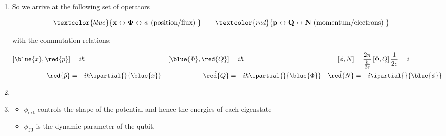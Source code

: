 \begin{enumerate}
  \item So we arrive at the following set of operators
  
  \begin{equation}
  { \textcolor{blue}{\mathbf{x\leftrightarrow \Phi \leftrightarrow \phi} \text{ (position/flux) }}\qquad \textcolor{red}{\mathbf{p\leftrightarrow Q \leftrightarrow N \text{ (momentum/electrons) }}}}
  \end{equation}
  
  \noindent with the commutation relations:
  
  \begin{align}
  \left[\blue{x},\red{p}\right] & =i\hbar & \left[\blue{\Phi},\red{Q}\right] & = i\hbar & \left[\phi,N\right] & = \frac{2\pi}{\frac{h}{2e}}\left[\Phi,Q\right]\frac{1}{2e} = i\\
  \red{\hat{p}} & = -i\hbar\ipartial{}{\blue{x}} & \hat{\red{Q}} & =-i\hbar\ipartial{}{\blue{\Phi}} & \hat{\red{N}} & =-i\ipartial{}{\blue{\phi}}
  \end{align}
  
  \item\ 
  
  
  \item{}
  \begin{itemize}
  	\item $ \phi_{\text{ext}} $ controls the shape of the potential and hence the energies of each eigenstate
  	\item $ \phi_{\text{JJ}} $ is the dynamic parameter of the qubit.
  \end{itemize}
\end{enumerate}
 
